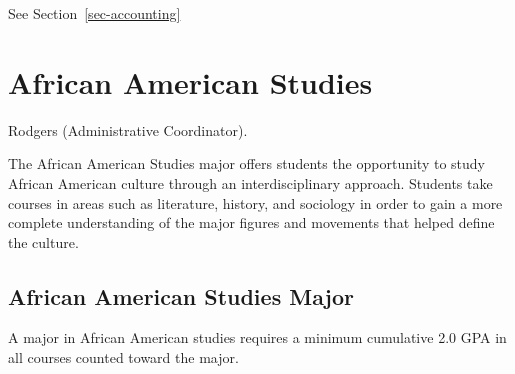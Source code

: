 \documentclass[
  letterpaper,
]{scrbook}
\begin{document}
See Section~\ref{sec-accounting}

\section{African American Studies}\label{african-american-studies}

Rodgers (Administrative Coordinator).

The African American Studies major offers students the opportunity to
study African American culture through an interdisciplinary approach.
Students take courses in areas such as literature, history, and
sociology in order to gain a more complete understanding of the major
figures and movements that helped define the culture.

\subsection{African American Studies
Major}\label{african-american-studies-major}

A major in African American studies requires a minimum cumulative 2.0
GPA in all courses counted toward the major.
\end{document}
